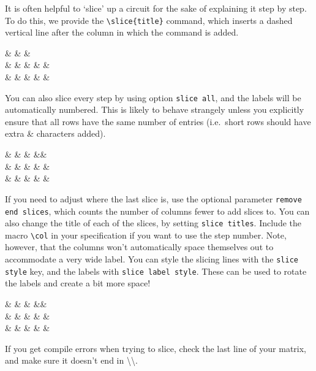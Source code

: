 \documentclass[aps,pra,10pt,nofootinbib]{revtex4-2}
\begin{document}
It is often helpful to `slice' up a circuit for the sake of explaining it step by step. To do this, we provide the \verb!\slice{title}! command, which inserts a dashed vertical line after the column in which the command is added.
\begin{Code}
  \begin{quantikz}
    &   &  & \meter{} \\
    &       & \targ{} &  &  & \\
    & & & \targ{} & &
  \end{quantikz}
\end{Code}
You can also slice every step by using option \verb!slice all!, and the labels will be automatically numbered. This is likely to behave strangely unless you explicitly ensure that all rows have the same number of entries (i.e.\ short rows should have extra \& characters added).
\begin{Code}
  \begin{quantikz}
    &  &  & \meter{} && \\
    &       & \targ{} &  &  & \\
    & & & \targ{} & &
  \end{quantikz}
\end{Code}
If you need to adjust where the last slice is, use the optional parameter \verb!remove end slices!, which counts the number of columns fewer to add slices to. You can also change the title of each of the slices, by setting \verb!slice titles!. Include the macro \verb!\col! in your specification if you want to use the step number. Note, however, that the columns won't automatically space themselves out to accommodate a very wide label. You can style the slicing lines with the \verb!slice style! key, and the labels with \verb!slice label style!. These can be used to rotate the labels and create a bit more space!
\begin{Code}
  \begin{quantikz}[slice all,remove end slices=1,slice titles=slice \col,slice style=blue,slice label style={inner sep=1pt,anchor=south west,rotate=40}]
    &  &  & \meter{} && \\
    &       & \targ{} &  &  & \\
    & & & \targ{} & &
  \end{quantikz}
\end{Code}
\noindent If you get compile errors when trying to slice, check the last line of your matrix, and make sure it doesn't end in \textbackslash\textbackslash.
\end{document}
